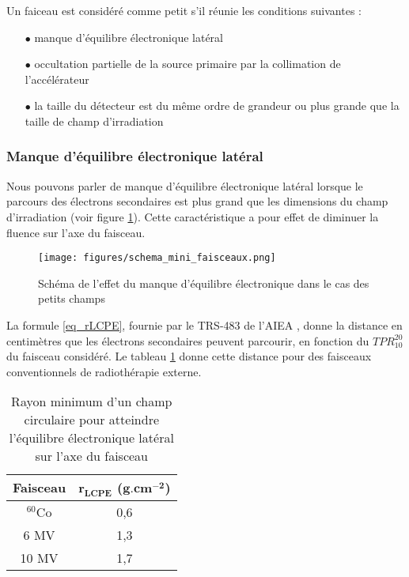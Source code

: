 \documentclass{article}
\begin{document}
Un faiceau est considéré comme petit s'il réunie les conditions suivantes : 

\begin{itemize}
  \item[$\bullet$] manque d'équilibre électronique latéral
  \item[$\bullet$] occultation partielle de la source primaire par la collimation de l'accélérateur
  \item[$\bullet$] la taille du détecteur est du même ordre de grandeur ou plus grande que la taille de champ d'irradiation
\end{itemize}

\subsubsection{Manque d'équilibre électronique latéral}

Nous pouvons parler de manque d'équilibre électronique latéral lorsque le parcours des électrons secondaires est plus grand que les dimensions du champ d'irradiation (voir figure \ref*{fig_schema_mini_faisceaux}). Cette caractéristique a pour effet de diminuer la fluence sur l'axe du faisceau.

\begin{figure}[h]
  \centering
  \texttt{[image: figures/schema\_mini\_faisceaux.png]}
  \caption{Schéma de l'effet du manque d'équilibre électronique dans le cas des petits champs}
  \label{fig_schema_mini_faisceaux}
\end{figure}

La formule \ref*{eq_rLCPE}, fournie par le TRS-483 de l'AIEA \cite{TRS483}, donne la distance en centimètres que les électrons secondaires peuvent parcourir, en fonction du $TPR^{20}_{10}$ du faisceau considéré. Le tableau \ref*{table_eq_lat} donne cette distance pour des faisceaux conventionnels de radiothérapie externe.

\begin{table}[h]
  \centering
  \begin{tabular}{cc}
    \toprule
    \bfseries Faisceau & $\mathbf{r_{LCPE}}$ \textbf{(}$\mathbf{\textbf{g.cm}^{-2}}$\textbf{)} \\
    \toprule
    $^{60}$Co & 0,6 \\
    6 MV & 1,3 \\
    10 MV & 1,7 \\
    \bottomrule
  \end{tabular}
  \caption{Rayon minimum d'un champ circulaire pour atteindre l'équilibre électronique latéral sur l'axe du faisceau}
  \label{table_eq_lat} 
\end{table}
\end{document}
